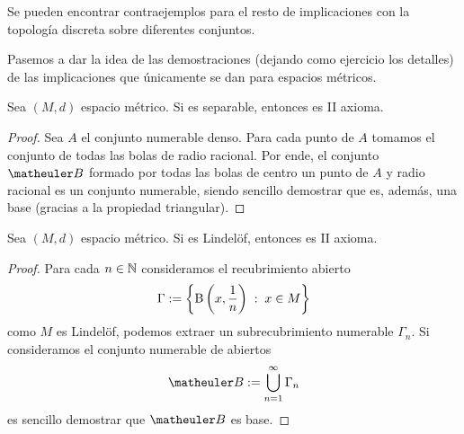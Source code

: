 Se pueden encontrar contraejemplos para el resto de implicaciones con la topología discreta sobre diferentes conjuntos.

Pasemos a dar la idea de las demostraciones (dejando como ejercicio los detalles) de las implicaciones que únicamente se dan para espacios métricos.
\begin{lem}[Separabilidad]
	Sea $(M,d)$ espacio métrico. Si es separable, entonces es II axioma.
\end{lem}
\begin{proof}
	Sea $A$ el conjunto numerable denso. Para cada punto de $A$ tomamos el conjunto de todas las bolas de radio racional. Por ende, el conjunto $\B$ formado por todas las bolas de centro un punto de $A$ y radio racional es un conjunto numerable, siendo sencillo demostrar que es, además, una base (gracias a la propiedad triangular).
\end{proof}
\begin{lem}[Lindelöf]
	Sea $(M,d)$ espacio métrico. Si es Lindelöf, entonces es II axioma.
\end{lem}
\begin{proof}
	Para cada $n\in\mathbb{N}$ consideramos el recubrimiento abierto
	\begin{equation*}
		\Gamma:=\left\{\operatorname{B}\left(x,\frac{1}{n}\right)\;:\; x\in M\right\}
	\end{equation*}
	como $M$ es Lindelöf, podemos extraer un subrecubrimiento numerable $\Gamma_n$. Si consideramos el conjunto numerable de abiertos
	\begin{equation*}
		\B:=\bigcup_{n=1}^{\infty}\Gamma_n
	\end{equation*}
	es sencillo demostrar que $\B$ es base. 
	\end{proof}
